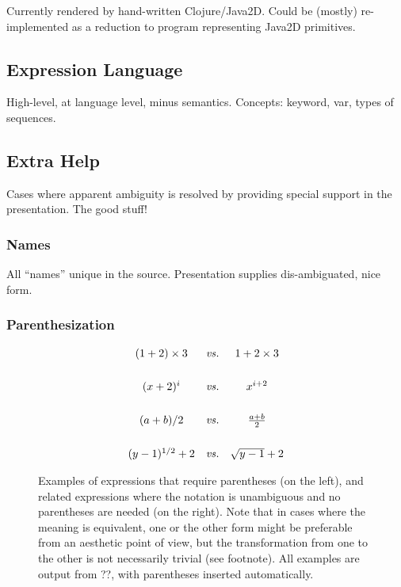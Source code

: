 Currently rendered by hand-written Clojure/Java2D. Could be (mostly) re-implemented as a reduction to program representing Java2D primitives.

\subsection{Expression Language}
High-level, at language level, minus semantics. Concepts: keyword, var, types of sequences.

\subsection{Extra Help}
Cases where apparent ambiguity is resolved by providing special support in the presentation. The good stuff!

\subsubsection{Names}
All ``names'' unique in the source. Presentation supplies dis-ambiguated, nice form.

\subsubsection{Parenthesization}
\begin{figure}[ht]
$$
\begin{array}{ccc}
\left(1+2\right)\times3 & 
  \mathrm{\it vs.} & 
  1 + 2\times3
\\
\vspace{6pt}
\\
(x+2)^i &
  \mathrm{\it vs.} & 
  x^{i+2}
\\
\vspace{6pt}
\\
(a+b)/2 & 
  \mathrm{\it vs.} & 
  {{a+b} \over 2}
\\
\vspace{6pt}
\\
(y-1)^{1/2} + 2 & 
  \mathrm{\it vs.} & 
  \sqrt{y-1} + 2
\end{array}
$$
\caption{Examples of expressions that require parentheses (on the left), and related expressions where the notation is unambiguous and no parentheses are needed (on the right). Note that in cases where the meaning is equivalent, one or the other form might be preferable from an aesthetic point of view, but the transformation from one to the other is not necessarily trivial (see footnote). All examples are output from ??, with parentheses inserted automatically. }
\label{fig-parens}
\end{figure}

